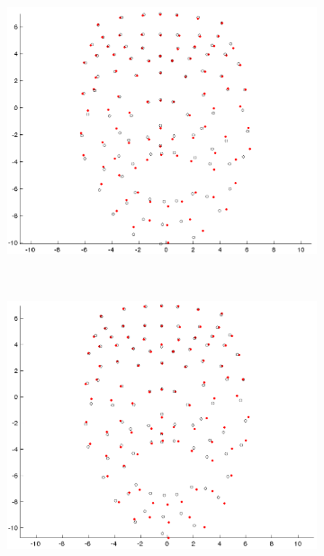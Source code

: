 \documentclass[11pt]{report}
\begin{document}
\begin{figure}[htbp!]
        \centering
        \begin{subfigure}[b]{0.3\textwidth}
                \includegraphics[width=\textwidth]{img/weights/3D/w2/w2_frame200_blends68.png}
        \end{subfigure}%
        ~ %
        \begin{subfigure}[b]{0.3\textwidth}
                \includegraphics[width=\textwidth]{img/weights/3D/w2/w2_frame400_blends68.png}

\end{subfigure}
\end{figure}
\end{document}
